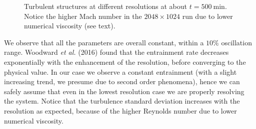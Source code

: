 \begin{figure}[t!]
  \centering
  \centering
      \hfill
    \caption{Turbulent structures at different resolutions at about $t=500 \ \mathrm{min}$. Notice the higher Mach number in the $2048 \times 1024$ run due to lower numerical viscosity (see text).}
    \label{fig:differentialmach}
 \end{figure}
We observe that all the parameters are overall constant, within a $10 \%$ oscillation range. Woodward \textit{et al.} (2016) found that the entrainment rate decreases exponentially with the enhancement of the resolution, before converging to the physical value. In our case we observe a constant entrainment (with a slight increasing trend, we presume due to second order phenomena), hence we can safely assume that even in the lowest resolution case we are properly resolving the system. Notice that the turbulence standard deviation increases with the resolution as expected, because of the higher Reynolds number due to lower numerical viscosity. 

